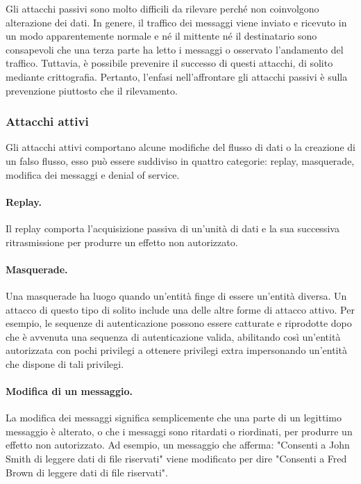 Gli attacchi passivi sono molto difficili da rilevare perché non coinvolgono alterazione dei dati. In genere, il traffico dei messaggi viene inviato e ricevuto in un modo apparentemente normale e né il mittente né il destinatario sono consapevoli che una terza parte ha letto i messaggi o osservato l'andamento del traffico. Tuttavia, è possibile prevenire il successo di questi attacchi, di solito mediante crittografia. Pertanto, l'enfasi nell'affrontare gli attacchi passivi è sulla prevenzione piuttosto che il rilevamento.

\subsubsection{Attacchi attivi}
Gli attacchi attivi comportano alcune modifiche del flusso di dati o la creazione
di un falso flusso, esso può essere suddiviso in quattro categorie: replay, masquerade, modifica dei messaggi e denial of service.

\paragraph{Replay.} Il replay comporta l'acquisizione passiva di un'unità di dati e la sua successiva ritrasmissione per produrre un effetto non autorizzato.


\paragraph{Masquerade.} Una masquerade ha luogo quando un'entità finge di essere un'entità diversa. Un attacco di questo tipo di solito include una delle altre forme di attacco attivo. Per esempio, le sequenze di autenticazione possono essere catturate e riprodotte dopo che è avvenuta una sequenza di autenticazione valida, abilitando così un'entità autorizzata con pochi privilegi a ottenere privilegi extra impersonando un'entità che dispone di tali privilegi.

\paragraph{Modifica di un messaggio.} La modifica dei messaggi significa semplicemente che una parte di un legittimo messaggio è alterato, o che i messaggi sono ritardati o riordinati, per produrre un effetto non autorizzato. Ad esempio, un messaggio che afferma: "Consenti a John Smith di leggere dati di file riservati" viene modificato per dire "Consenti a Fred Brown di leggere dati di file riservati".

